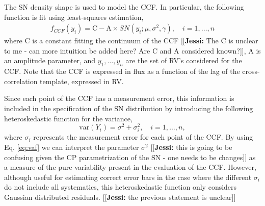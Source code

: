 \documentclass[11pt, oneside]{article}
\newcommand{\jessi}[1]{{\color{Purple}[[\textbf{Jessi: }#1]]}}
\begin{document}
The SN density shape is used to model the CCF.  In particular, the following function is fit using least-squares estimation,
%
\begin{eqnarray} \label{eq:3}
f_{CCF}(y_i) = \mathrm{C} - \mathrm{A} \times SN(y_i;\mu, \sigma^2, \gamma), \quad i = 1, \ldots, n
\end{eqnarray}
%
where C is a constant fitting the continuum of the CCF \jessi{The C is unclear to me - can more intuition be added here?  Are C and A considered known?}, A is an amplitude parameter, and $y_1, \ldots, y_n$ are the set of RV's considered for the CCF. Note that the CCF is expressed in flux as a function of the lag of the cross-correlation template, expressed in RV.

Since each point of the CCF has a measurement error, this information is included in the specification of the SN distribution by introducing the following heteroskedastic function for the variance,
%
\begin{equation}
\text{var}(Y_{i})=\sigma^{2}+\sigma_{i}^{2}, \quad i = 1, \dots, n,
\label{eq:vaf}
\end{equation}
%
where $\sigma_{i}$ represents the measurement error for each point of the CCF. By using Eq. \ref{eq:vaf} we can interpret the parameter $\sigma^{2}$ \jessi{this is going to be confusing given the CP parametrization of the SN - one needs to be changes} as a measure of the pure variability present in the evaluation of the CCF. 
However, although useful for estimating correct error bars in the case where the different $\sigma_{i}$ do not include all systematics, this heteroskedastic function only considers Gaussian distributed residuals. \jessi{the previous statement is unclear}
%
\end{document}
